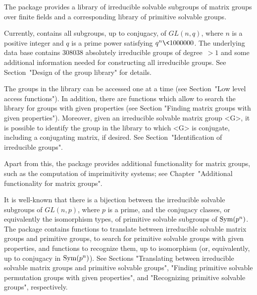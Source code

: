



The package {\IRREDSOL} provides a library of irreducible
solvable subgroups of matrix groups over finite fields and a corresponding library of primitive solvable groups.

Currently, {\IRREDSOL} contains all subgroups, up to conjugacy, of $GL(n, q)$, 
where $n$ is a positive integer and $q$
is a prime power satisfying  $q^n \< 1000000$. The underlying data base contains 
$308038$ absolutely irreducible groups of degree~$> 1$ and some additional information
needed for constructing all irreducible groups. See Section~"Design of the group library"
for details.

The groups in the {\IRREDSOL} 
library can be accessed one at a time (see Section~"Low
level access functions"). In addition, there are functions which allow to 
search the library for groups with given properties (see Section "Finding
matrix groups with given properties"). Moreover, given an irreducible solvable matrix group
<G>, it is possible to identify the group in the library to which <G> is conjugate,
including a conjugating matrix, if desired. See Section~"Identification of irreducible
groups".

Apart from this, the {\IRREDSOL} package provides additional functionality
for matrix groups, such as the computation of imprimitivity systems;
see Chapter~"Additional functionality for matrix groups".

It is well-known that there is a bijection between the  irreducible solvable subgroups of
$GL(n, p)$, where
$p$ is a prime, and the conjugacy classes, or equivalently the isomorphism types, of
primitive solvable subgroups of ${\rm Sym}(p^n)$. The {\IRREDSOL} package contains
functions to translate between irreducible solvable matrix groups and primitive
groups, to search for primitive solvable groups with given  properties, and functions to
recognize them, up to isomorphism (or, equivalently, up to conjugacy in ${\rm Sym}(p^n)$).  See Sections "Translating between irreducible solvable
matrix groups and primitive solvable groups", "Finding primitive solvable permutation
groups with given properties", and "Recognizing primitive solvable groups", respectively.

